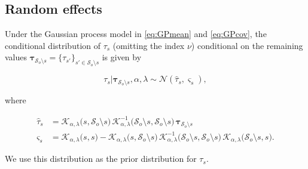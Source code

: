 \documentclass[11pt,english]{article}
\newcommand{\bs}[1]{\boldsymbol{#1}}
\newcommand{\mc}[1]{\mathcal{#1}}
\newcommand{\bl}{\begin{linenomath}}
\newcommand{\el}{\end{linenomath}}
\begin{document}
\subsection{Random effects}

Under the Gaussian process model in \eqref{eq:GPmean} and \eqref{eq:GPcov}, the conditional distribution of $\tau_s$ (omitting the index $\nu$) conditional on the remaining values $\bs{\tau}_{\mc{S}_o \setminus s} = \{ \tau_{s'} \}_{s' \in \mc{S}_o \setminus s}$ is given by 
\bl\begin{equation}\label{eq:tauPrior}
\tau_s | \bs{\tau}_{\mc{S}_o \setminus s}, \alpha, \lambda \sim \mc{N} (\hat{\tau}_s, \varsigma_s),
\end{equation}\el
where 
\bl\begin{align*}
\hat{\tau}_s &= \mc{K}_{\alpha, \lambda}\big(s,\mc{S}_o\setminus s \big) \, \mc{K}^{-1}_{\alpha,\lambda}\big(\mc{S}_o\setminus s, \mc{S}_o\setminus s \big) \, \bs{\tau}_{\mc{S}_o\setminus s}\\
\varsigma_s &= \mc{K}_{\alpha, \lambda}\big(s,s\big) - \mc{K}_{\alpha, \lambda}\big(s,\mc{S}_o\setminus s \big) \, \mc{K}^{-1}_{\alpha,\lambda}\big(\mc{S}_o\setminus s, \mc{S}_o\setminus s\big) \, \mc{K}_{\alpha, \lambda}\big(\mc{S}_o\setminus s,s\big).
\end{align*}\el
We use this distribution as the prior distribution for $\tau_s$. 
\end{document}

